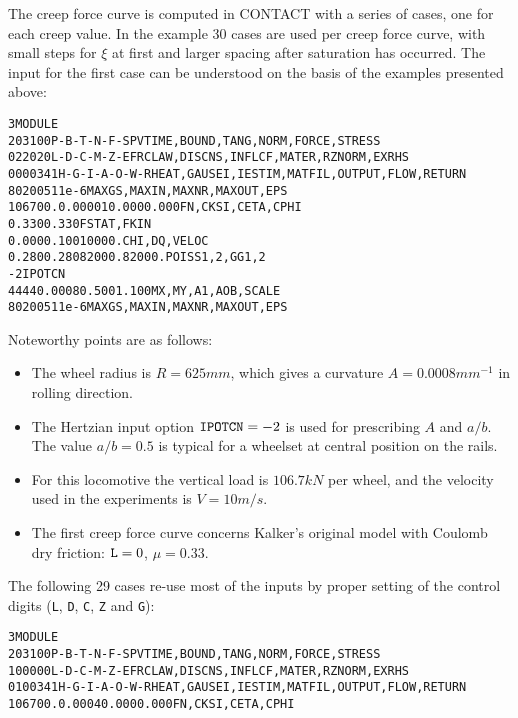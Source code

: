 \documentclass[12pt]{report}
\begin{document}
The creep force curve is computed in CONTACT with a series of cases, one
for each creep value. In the example 30 cases are used per creep force
curve, with small steps for $\xi$ at first and larger spacing after
saturation has occurred. The input for the first case can be understood on
the basis of the examples presented above:
\begin{alltt}\small
 3 MODULE
  203100     P-B-T-N-F-S        PVTIME, BOUND , TANG  , NORM , FORCE, STRESS
  022020     L-D-C-M-Z-E        FRCLAW, DISCNS, INFLCF, MATER, RZNORM, EXRHS
 0000341   H-G-I-A-O-W-R  HEAT, GAUSEI, IESTIM, MATFIL, OUTPUT, FLOW, RETURN
    80   200    5    1      1e-6    MAXGS , MAXIN , MAXNR , MAXOUT, EPS
 106700.      0.00001    0.000      0.000           FN, CKSI, CETA, CPHI
   0.330      0.330                                 FSTAT, FKIN
   0.000      0.100      10000.                     CHI, DQ, VELOC
   0.280      0.280      82000.     82000.          POISS 1,2,  GG 1,2
   -2                                               IPOTCN
   44   44    0.0008     0.500      1.100           MX,MY,A1,AOB,SCALE
    80   200    5    1      1e-6    MAXGS , MAXIN , MAXNR , MAXOUT, EPS
\end{alltt}
Noteworthy points are as follows:
\begin{itemize}
\item The wheel radius is $R=625\unit{mm}$, which gives a curvature
        $A=0.0008\unit{mm^{-1}}$ in rolling direction.
\item The Hertzian input option ${\tt IPOTCN}=-2$ is used for prescribing
        $A$ and $a/b$. The value $a/b=0.5$ is typical for a wheelset
        at central position on the rails.
\item For this locomotive the vertical load is $106.7\unit{kN}$ per wheel, and
        the velocity used in the experiments is $V=10\unit{m/s}$.
\item The first creep force curve concerns Kalker's original model with
        Coulomb dry friction: ${\tt L}=0$, $\mu=0.33$.
\end{itemize}
The following 29 cases re-use most of the inputs by proper setting of
the control digits ({\tt L}, {\tt D}, {\tt C}, {\tt Z} and {\tt G}):
\begin{alltt}\small
 3 MODULE
  203100     P-B-T-N-F-S        PVTIME, BOUND , TANG  , NORM , FORCE, STRESS
  100000     L-D-C-M-Z-E        FRCLAW, DISCNS, INFLCF, MATER, RZNORM, EXRHS
 0100341   H-G-I-A-O-W-R  HEAT, GAUSEI, IESTIM, MATFIL, OUTPUT, FLOW, RETURN
 106700.      0.0004     0.000      0.000           FN, CKSI, CETA, CPHI
\end{alltt}
\end{document}
